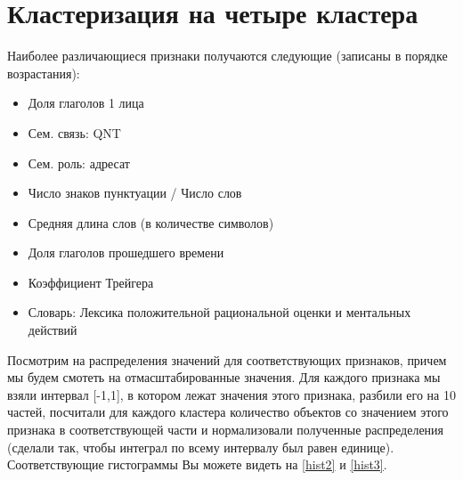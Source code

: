 \documentclass[12pt]{article}
\begin{document}
\section{Кластеризация на четыре кластера}
\label{sec:cluster}

Наиболее различающиеся признаки получаются следующие (записаны в порядке возрастания):

\begin{itemize}
\item Доля глаголов 1 лица
\item Сем. связь: QNT
\item Сем. роль: адресат
\item Число знаков пунктуации / Число слов
\item Средняя длина слов (в количестве символов)
\item Доля глаголов прошедшего времени
\item Коэффициент Трейгера
\item Словарь: Лексика положительной рациональной оценки и ментальных действий
\end{itemize}

Посмотрим на распределения значений для соответствующих признаков, причем мы будем смотеть на отмасштабированные значения. Для каждого признака мы взяли интервал [-1,1], в котором лежат значения этого признака, разбили его на 10 частей, посчитали для каждого кластера количество объектов со значением этого признака в соответствующей части и нормализовали полученные распределения (сделали так, чтобы интеграл по всему интервалу был равен единице). Соответствующие гистограммы Вы можете видеть на \ref{hist2} и \ref{hist3}.
\end{document}
